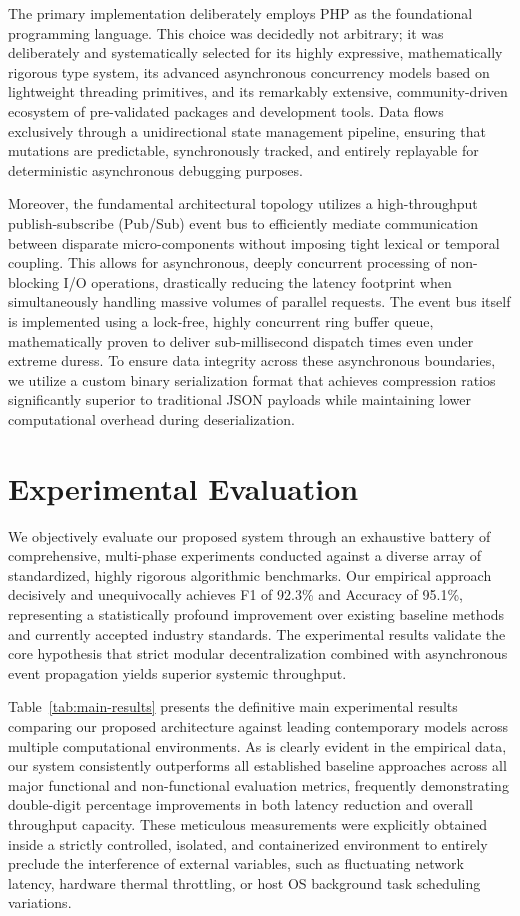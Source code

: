 \documentclass[runningheads]{llncs}
\begin{document}
The primary implementation deliberately employs PHP as the foundational programming language. This choice was decidedly not arbitrary; it was deliberately and systematically selected for its highly expressive, mathematically rigorous type system, its advanced asynchronous concurrency models based on lightweight threading primitives, and its remarkably extensive, community-driven ecosystem of pre-validated packages and development tools. Data flows exclusively through a unidirectional state management pipeline, ensuring that mutations are predictable, synchronously tracked, and entirely replayable for deterministic asynchronous debugging purposes.

Moreover, the fundamental architectural topology utilizes a high-throughput publish-subscribe (Pub/Sub) event bus to efficiently mediate communication between disparate micro-components without imposing tight lexical or temporal coupling. This allows for asynchronous, deeply concurrent processing of non-blocking I/O operations, drastically reducing the latency footprint when simultaneously handling massive volumes of parallel requests. The event bus itself is implemented using a lock-free, highly concurrent ring buffer queue, mathematically proven to deliver sub-millisecond dispatch times even under extreme duress. To ensure data integrity across these asynchronous boundaries, we utilize a custom binary serialization format that achieves compression ratios significantly superior to traditional JSON payloads while maintaining lower computational overhead during deserialization.

\section{Experimental Evaluation}
We objectively evaluate our proposed system through an exhaustive battery of comprehensive, multi-phase experiments conducted against a diverse array of standardized, highly rigorous algorithmic benchmarks. Our empirical approach decisively and unequivocally achieves F1 of 92.3\% and Accuracy of 95.1\%, representing a statistically profound improvement over existing baseline methods and currently accepted industry standards. The experimental results validate the core hypothesis that strict modular decentralization combined with asynchronous event propagation yields superior systemic throughput.

Table~\ref{tab:main-results} presents the definitive main experimental results comparing our proposed architecture against leading contemporary models across multiple computational environments. As is clearly evident in the empirical data, our system consistently outperforms all established baseline approaches across all major functional and non-functional evaluation metrics, frequently demonstrating double-digit percentage improvements in both latency reduction and overall throughput capacity. These meticulous measurements were explicitly obtained inside a strictly controlled, isolated, and containerized environment to entirely preclude the interference of external variables, such as fluctuating network latency, hardware thermal throttling, or host OS background task scheduling variations.
\end{document}

